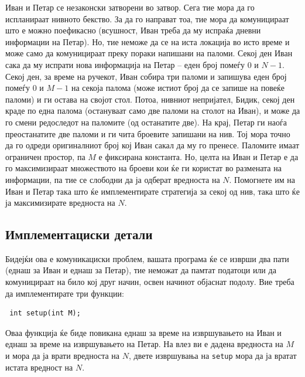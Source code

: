 \documentclass[12pt]{article}
\begin{document}
\renewcommand{\round}{Ден 1}
\renewcommand{\problemName}{Задача Затвор}
\renewcommand{\lang}{Македонски}

\renewcommand{\tl}{$2$ sec.}
\renewcommand{\ml}{$1024$ MB}
\problem{\problemName}

Иван и Петар се незаконски затворени во затвор. Сега тие мора да го испланираат нивното бекство. За да го направат тоа, тие мора да комуницираат што е можно поефикасно (всушност, Иван треба да му испраќа дневни информации на Петар). Но, тие неможе да се на иста локација во исто време и може само да комуницираат преку пораки напишани на паломи. Секој ден Иван сака да му испрати нова информација на Петар -- еден број помеѓу $0$ и $N-1$. Секој ден, за време на ручекот, Иван собира три паломи и запишува еден број помеѓу $0$ и $M-1$ на секоја палома (може истиот број да се запише на повеќе паломи) и ги остава на својот стол. Потоа, нивниот непријател, Бидик, секој ден краде по една палома (остануваат само две паломи на столот на Иван), и може да го смени редоследот на паломите (од останатите две). На крај, Петар ги наоѓа преостанатите две паломи и ги чита броевите запишани на нив. Тој мора точно да го одреди оригиналниот број кој Иван сакал да му го пренесе. Паломите имаат ограничен простор, па $M$ е фиксирана константа. Но, целта на Иван и Петар е да го максимизираат множеството на броеви кои ќе ги користат во размената на информации, па тие се слободни да ја одберат вредноста на $N$. Помогнете им на Иван и Петар така што ќе имплементирате стратегија за секој од нив, така што ќе ја максимизирате вредноста на $N$.


\subsection{Имплементациски детали}
Бидејќи ова е комуникациски проблем, вашата програма ќе се изврши два пати (еднаш за Иван и еднаш за Петар), тие неможат да памтат податоци или да комуницираат на било кој друг начин, освен начинот објаснат подолу. Вие треба да имплементирате три функции:

\begin{lstlisting}
 int setup(int M);
\end{lstlisting}


Оваа функција ќе биде повикана еднаш за време на извршувањето на Иван и еднаш за време на извршувањето на Петар. На влез ви е дадена вредноста на $M$ и мора да ја врати вредноста на $N$, двете извршувања на \texttt{setup} мора да ја вратат истата вредност на $N$.
\end{document}
